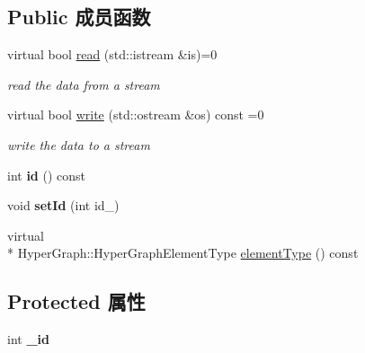 \subsection*{Public 成员函数}
\begin{DoxyCompactItemize}
\item 
\hypertarget{classg2o_1_1Parameter_a77d9d88d8bde52198631fcd0fc4c9d0e}{virtual bool \hyperlink{classg2o_1_1Parameter_a77d9d88d8bde52198631fcd0fc4c9d0e}{read} (std\-::istream \&is)=0}\label{classg2o_1_1Parameter_a77d9d88d8bde52198631fcd0fc4c9d0e}

\begin{DoxyCompactList}\small\item\em read the data from a stream \end{DoxyCompactList}\item 
\hypertarget{classg2o_1_1Parameter_a18e66a40cd71a4da2ab9be5ba318abb7}{virtual bool \hyperlink{classg2o_1_1Parameter_a18e66a40cd71a4da2ab9be5ba318abb7}{write} (std\-::ostream \&os) const =0}\label{classg2o_1_1Parameter_a18e66a40cd71a4da2ab9be5ba318abb7}

\begin{DoxyCompactList}\small\item\em write the data to a stream \end{DoxyCompactList}\item 
\hypertarget{classg2o_1_1Parameter_a73cfeeee19f22b56391c995108cd89eb}{int {\bfseries id} () const }\label{classg2o_1_1Parameter_a73cfeeee19f22b56391c995108cd89eb}

\item 
\hypertarget{classg2o_1_1Parameter_a2872398ab7d8c95d0a1b5ca5bbfae461}{void {\bfseries set\-Id} (int id\-\_\-)}\label{classg2o_1_1Parameter_a2872398ab7d8c95d0a1b5ca5bbfae461}

\item 
virtual \\*
Hyper\-Graph\-::\-Hyper\-Graph\-Element\-Type \hyperlink{classg2o_1_1Parameter_aff546d31d4c558df761a3cec06a91bf8}{element\-Type} () const 
\end{DoxyCompactItemize}
\subsection*{Protected 属性}
\begin{DoxyCompactItemize}
\item 
\hypertarget{classg2o_1_1Parameter_a602d08079c6a3a5f868e41a102e1db0b}{int {\bfseries \-\_\-id}}\label{classg2o_1_1Parameter_a602d08079c6a3a5f868e41a102e1db0b}

\end{DoxyCompactItemize}


